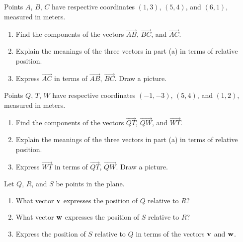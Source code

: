 \documentclass{ximera}
\begin{document}
\begin{question}  \label{QMNDVBed43}
Points $A$, $B$, $C$ have respective coordinates $(1,3)$, $(5,4)$, and $(6,1)$, measured in meters.
\begin{enumerate}
\item Find the components of the vectors $\overrightarrow{AB}$, $\overrightarrow{BC}$, and $\overrightarrow{AC}$.

\item Explain the meanings of the three vectors in part (a) in terms of relative position.

\item Express $\overrightarrow{AC}$ in terms of $\overrightarrow{AB}$, $\overrightarrow{BC}$. Draw a picture.
\end{enumerate}

\end{question}

\begin{question} \label{QDFEUJZXFedd}
Points $Q$, $T$, $W$ have respective coordinates $(-1,-3)$, $(5,4)$, and $(1,2)$, measured in meters.

\begin{enumerate}
\item Find the components of the vectors $\overrightarrow{QT}$, $\overrightarrow{QW}$, and $\overrightarrow{WT}$.

\item Explain the meanings of the three vectors in part (a) in terms of relative position.

\item Express $\overrightarrow{WT}$ in terms of $\overrightarrow{QT}$, $\overrightarrow{QW}$. Draw a picture.
\end{enumerate}

\end{question}


\begin{question}  \label{QodfderrewEWR}
Let $Q$, $R$, and $S$ be points in the plane.

\begin{enumerate}
\item What vector ${\bf v}$ expresses the position of $Q$ relative to $R$?

\item What vector ${\bf w}$ expresses the position of $S$ relative to $R$?

\item Express the position of $S$ relative to $Q$ in terms of the vectors ${\bf v}$ and ${\bf w}$.
\end{enumerate}
\end{question}
\end{document}
